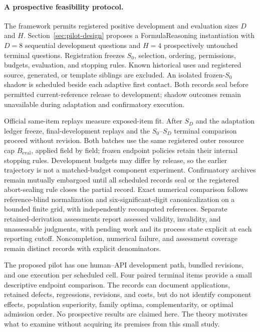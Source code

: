 \documentclass[10pt]{article} %
\providecommand{\1}{\mathbf{1}}  %
\theoremstyle{remark}
\theoremstyle{definition}
\begin{document}
\paragraph{A prospective feasibility protocol.}

The framework permits registered positive development and evaluation sizes
$D$ and $H$. Section~\ref{sec:pilot-design} proposes a FormulaReasoning
instantiation with $D=8$ sequential development questions and $H=4$
prospectively untouched terminal questions. Registration freezes $S_0$,
selection, ordering, permissions, budgets, evaluation, and stopping rules.
Known historical uses and registered source, generated, or template
siblings are excluded. An isolated frozen-$S_0$ shadow is scheduled beside
each adaptive first contact. Both records seal before permitted
current-reference release to development; shadow outcomes remain unavailable during
adaptation and confirmatory execution.

Official same-item replays measure exposed-item fit. After $S_D$ and the
adaptation ledger freeze, final-development replays and the
$S_0$--$S_D$ terminal comparison proceed without revision. Both batches use
the same registered outer resource cap $B_{\mathrm{eval}}$, applied
field by field; frozen endpoint policies retain their internal stopping
rules. Development budgets may differ by release, so the earlier
trajectory is not a matched-budget component experiment. Confirmatory
archives remain mutually embargoed until all scheduled records seal or
the registered abort-sealing rule closes the partial record. Exact
numerical comparison follows reference-blind normalization and
six-significant-digit canonicalization on a bounded finite grid, with
independently recomputed references. Separate retained-derivation
assessments report assessed validity, invalidity, and unassessable
judgments, with pending work and its process state explicit at each
reporting cutoff. Noncompletion, numerical failure, and assessment coverage
remain distinct records with explicit denominators.

The proposed pilot has one human--API development path, bundled revisions,
and one execution per scheduled cell. Four paired terminal items provide
a small descriptive endpoint comparison. The records can document
applications, retained defects, regressions, revisions, and costs, but do
not identify component effects, population superiority, family optima,
complementarity, or optimal admission order. No prospective results are
claimed here. The theory motivates what to examine without acquiring its
premises from this small study.
\end{document}
